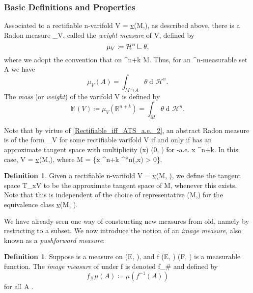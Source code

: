\documentclass[a4paper, 11pt]{article}
\theoremstyle{plain}
\theoremstyle{definition}
\newtheorem{definition}[theorem]{Definition}
\theoremstyle{remark}
\DeclareMathOperator{\diff}{d \!}
\newcommand{\mres}{\mathrel{\vrule height 1.6ex depth 0pt width 0.13ex\vrule height 0.13ex depth 0pt width 1.3ex}} %
\numberwithin{equation}{subsection}
\def\({}
\def\){}
\begin{document}
\subsubsection{Basic Definitions and Properties}

Associated to a rectifiable \(n\)-varifold \(V = \underline{v}(M,\theta)\), as described above, there is a Radon measure \(\mu_V\), called the \emph{weight measure} of \(V\), defined by
\begin{equation}
\mu_V \coloneq \mathcal{H}^{n} \mres \theta,
\end{equation}
where we adopt the convention that \(\theta {}\) on \(^{n+k} \setminus M\). Thus, for an \(^{n}\)-measurable set \(A\) we have
\begin{equation}
\mu_V(A) = \int_{M \cap A} \theta \diff \mathcal{H}^{n}.
\end{equation}
The \emph{mass} (or \emph{weight}) of the varifold \(V\) is defined by
\begin{equation}
\mathbb{M}(V) \coloneq \mu_V(\mathbb{R}^{n+k}) = \int_{M} \theta \diff \mathcal{H}^{n}.
\end{equation}

Note that by virtue of \cref{Rectifiable_iff_ATS_a.e._2}, an abstract Radon measure \(\mu\) is of the form \(\mu_V\) for some rectifiable varifold \(V\) if and only if \(\mu\) has an approximate tangent space with multiplicity \(\theta(x) \in (0, \infty)\) for \(\mu\)-a.e. \(x \in {}^{n+k}\). In this case, \(V = \underline{v}(M,\theta)\), where \(M = \{x \in {}^{n+k} \vcentcolon \Theta^{*n}(\mu,x) > 0\}\).

\begin{definition}
Given a rectifiable \(n\)-varifold \(V = \underline{v}(M, \theta)\), we define the tangent space \(T_{x}V\) to be the approximate tangent space of \(M\), whenever this exists. Note that this is independent of the choice of representative \((M,\theta)\) for the equivalence class \(\underline{v}(M, \theta)\).
\end{definition}

We have already seen one way of constructing new measures from old, namely by restricting to a subset. We now introduce the notion of an \emph{image measure}, also known as a \emph{pushforward measure}:

\begin{definition}
Suppose \(\mu\) is a measure on \((E, )\), and \(f \vcentcolon (E, ) \rightarrow (F, )\) is a measurable function. The \emph{image measure} of \(\mu\) under \(f\) is denoted \(f_{\#}\mu\) and defined by
\begin{equation}
f_{\#}\mu(A) \coloneq \mu(f^{-1}(A))
\end{equation}
for all \(A \in {}\).
\end{definition} 
\end{document}
